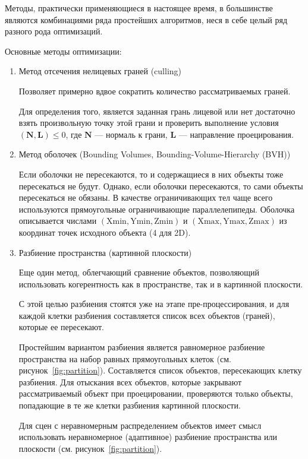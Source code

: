 Методы, практически применяющиеся в настоящее время, в большинстве являются комбинациями ряда простейших алгоритмов, неся в себе целый ряд разного рода оптимизаций.~\cite{shishkin}

Основные методы оптимизации:

\begin{enumerate}
	\item Метод отсечения нелицевых граней (culling)
	
Позволяет примерно вдвое сократить количество рассматриваемых граней.

Для определения того, является заданная грань лицевой или нет достаточно взять произвольную точку этой грани и проверить выполнение условия \( ( \mathbf{N}, \mathbf{L} ) \leq 0 \), где \( \mathbf{N} \) — нормаль к грани, \( \mathbf{L} \) — направление проецирования.

	\item Метод оболочек (Bounding Volumes, Bounding-Volume-Hierarchy (BVH))
	
Если оболочки не пересекаются, то и содержащиеся в них объекты тоже пересекаться не будут. Однако, если оболочки пересекаются, то сами объекты пересекаться не обязаны. В качестве ограничивающих тел чаще всего используются прямоугольные ограничивающие параллелепипеды. Оболочка описывается числами \( (\text{Xmin}, \text{Ymin}, \text{Zmin}) \) и \( (\text{Xmax}, \text{Ymax}, \text{Zmax}) \) из координат точек исходного объекта (4 для 2D).

	\item Разбиение пространства (картинной плоскости)
	
Еще один метод, облегчающий сравнение объектов, позволяющий использовать когерентность как в пространстве, так и в картинной плоскости.

С этой целью разбиения стоятся уже на этапе пре-процессирования, и для каждой клетки разбиения составляется список всех объектов (граней), которые ее пересекают.

Простейшим вариантом разбиения является равномерное разбиение
пространства на набор равных прямоугольных клеток (см. рисунок~\ref{fig:partition}). Составляется список объектов, пересекающих клетку разбиения. Для
отыскания всех объектов, которые закрывают рассматриваемый объект
при проецировании, проверяются только объекты, попадающие в те же
клетки разбиения картинной плоскости.

Для сцен с неравномерным распределением объектов имеет смысл
использовать неравномерное (адаптивное) разбиение пространства
или плоскости (см. рисунок~\ref{fig:partition}).


\end{enumerate}
